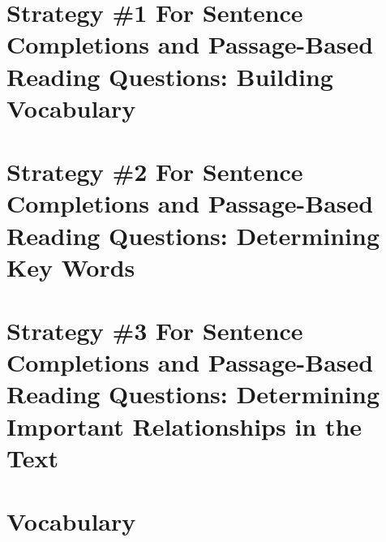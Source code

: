 \documentclass[12pt]{book}
\begin{document}
\chapter{Strategy \#1 For Sentence Completions and Passage-Based Reading Questions: Building Vocabulary}
	
	
	
	
	
	
	
	
	
	
	
	
	

\chapter{Strategy \#2 For Sentence Completions and Passage-Based Reading Questions: Determining Key Words}
	
	
	
	
	
	
	

\chapter{Strategy \#3 For Sentence Completions and Passage-Based Reading Questions: Determining Important Relationships in the Text}
	
	
	
	
	

\chapter{Vocabulary}
	

%
\end{document}
